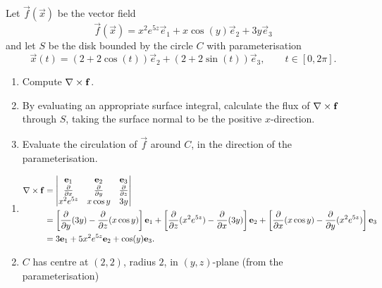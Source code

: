 \documentclass[10pt, a4paper]{article}
\begin{document}
\begin{problem}
    Let $\vec{f}(\vec{x})$ be the vector field
    \[
    \vec{f}(\vec{x}) = x ^ 2e ^ {5z}\vec{e}_1 + x\cos(y)\vec{e}_2 + 3y\vec{e}_3
    \]
    and let $S$ be the disk bounded by the circle $C$ with parameterisation
    \[
    \vec{x}(t) = (2 + 2\cos(t))\vec{e}_2 + (2 + 2\sin(t))\vec{e}_3,\qquad t \in [0, 2\pi].
    \]

    \begin{enumerate}[label = (\alph*)]
        \item Compute $\mathbf{\nabla} \times \mathbf{f}$.

        \item By evaluating an appropriate surface integral,
        calculate the flux of $\mathbf{\nabla} \times \mathbf{f}$ through $S$,
        taking the surface normal to be the positive $x$-direction.

        \item Evaluate the circulation of $\vec{f}$ around $C$,
        in the direction of the parameterisation.
    \end{enumerate}

    \begin{solution}
        \begin{enumerate}[label = (\alph*)]
            \item
            \begin{align*}
                \mathbf{\nabla} \times \mathbf{f} &= \begin{vmatrix}
                    \mathbf{e}_1 & \mathbf{e}_2 & \mathbf{e}_3 \\
                    \frac{\partial }{\partial x} & \frac{\partial }{\partial y} & \frac{\partial }{\partial z} \\
                    x ^ 2e ^ {5z} & x\cos{y} & 3y
                \end{vmatrix} \\
                &= \left[\frac{\partial }{\partial y}(3y) - \frac{\partial }{\partial z}(x\cos{y})\right]\mathbf{e}_1 + \left[\frac{\partial }{\partial z}(x ^ 2e ^ {5z}) - \frac{\partial }{\partial x}(3y)\right]\mathbf{e}_2 + \left[\frac{\partial }{\partial x}(x\cos{y}) - \frac{\partial }{\partial y}(x ^ 2e ^ {5z})\right]\mathbf{e}_3 \\
                &= 3\mathbf{e}_1 + 5x ^ 2e ^ {5z}\mathbf{e}_2 + \cos(y)\mathbf{e}_3.
            \end{align*}

            \item
            $C$ has centre at $(2, 2)$,
            radius $2$,
            in $(y, z)$-plane
            (from the parameterisation)


\end{enumerate}
\end{solution}
\end{problem}
\end{document}
